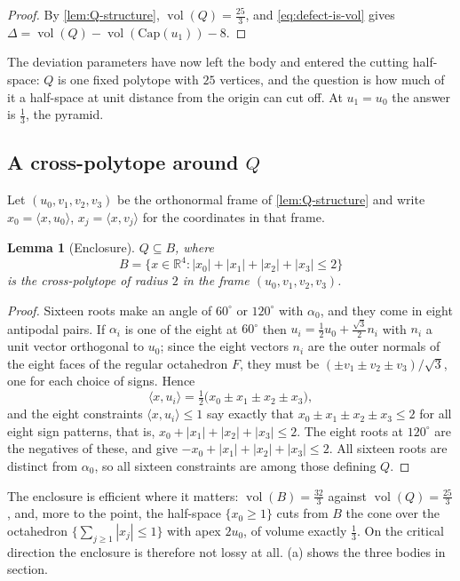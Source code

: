\documentclass[11pt,reqno]{amsart}
\renewcommand{\_}{\origunderscore\allowbreak}
\numberwithin{equation}{section}
\theoremstyle{plain}
\newtheorem{lem}[thm]{Lemma}
\theoremstyle{definition}
\theoremstyle{remark}
\newcommand{\defect}{\Delta}                 %
\newcommand{\base}{u}                        %
\newcommand{\capQ}{\mathrm{Cap}}             %
\DeclareMathOperator{\vol}{vol}
\begin{document}
\begin{proof}
By \cref{lem:Q-structure}, $\vol(Q)=\tfrac{25}{3}$, and
\cref{eq:defect-is-vol} gives $\defect=\vol(Q)-\vol(\capQ(\base_1))-8$.
\end{proof}

The deviation parameters have now left the body and entered the cutting
half-space: $Q$ is one fixed polytope with $25$ vertices, and the
question is how much of it a half-space at unit distance from the origin
can cut off. At $\base_1=\base_0$ the answer is $\tfrac13$, the pyramid.

\subsection{A cross-polytope around \texorpdfstring{$Q$}{Q}}\label{sec:crosspolytope}

Let $(\base_0,v_1,v_2,v_3)$ be the orthonormal frame of
\cref{lem:Q-structure} and write $x_0=\langle x,\base_0\rangle$,
$x_j=\langle x,v_j\rangle$ for the coordinates in that frame.

\begin{lem}[Enclosure]\label{lem:crosspolytope}
$Q\subseteq B$, where
\[
  B=\bigl\{x\in\mathbb{R}^4 : |x_0|+|x_1|+|x_2|+|x_3|\le2\bigr\}
\]
is the cross-polytope of radius $2$ in the frame
$(\base_0,v_1,v_2,v_3)$.
\end{lem}

\begin{proof}
Sixteen roots make an angle of $60^\circ$ or $120^\circ$ with $\alpha_0$,
and they come in eight antipodal pairs. If $\alpha_i$ is one of the eight
at $60^\circ$ then $\base_i=\tfrac12\base_0+\tfrac{\sqrt3}{2}n_i$ with
$n_i$ a unit vector orthogonal to $\base_0$; since the eight vectors $n_i$
are the outer normals of the eight faces of the regular octahedron $F$,
they must be $(\pm v_1\pm v_2\pm v_3)/\sqrt3$, one for each choice of
signs.
Hence
\[
  \langle x,\base_i\rangle
  =\tfrac12\bigl(x_0\pm x_1\pm x_2\pm x_3\bigr),
\]
and the eight constraints $\langle x,\base_i\rangle\le1$ say exactly that
$x_0\pm x_1\pm x_2\pm x_3\le2$ for all eight sign patterns, that is,
$x_0+|x_1|+|x_2|+|x_3|\le2$. The eight roots at $120^\circ$ are the
negatives of these, and give $-x_0+|x_1|+|x_2|+|x_3|\le2$. All sixteen
roots are distinct from $\alpha_0$, so all sixteen constraints are among
those defining $Q$.
\end{proof}

The enclosure is efficient where it matters: $\vol(B)=\tfrac{32}{3}$
against $\vol(Q)=\tfrac{25}{3}$, and, more to the point, the half-space
$\{x_0\ge1\}$ cuts from $B$ the cone over the octahedron
$\{\sum_{j\ge1}|x_j|\le1\}$ with apex $2\base_0$, of volume exactly
$\tfrac13$. On the critical direction the enclosure is therefore not lossy
at all. (a) shows the three bodies in section.
\end{document}
